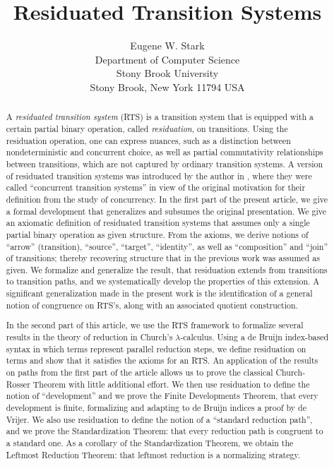 \documentclass[11pt,notitlepage,a4paper]{report}
\begin{document}
\title{Residuated Transition Systems}
\author{Eugene W. Stark\\[\medskipamount]
        Department of Computer Science\\
        Stony Brook University\\
        Stony Brook, New York 11794 USA}
\maketitle

\begin{abstract}
A \emph{residuated transition system} (RTS) is a transition system that is equipped with a
certain partial binary operation, called \emph{residuation}, on transitions.
Using the residuation operation, one can express nuances, such as a distinction
between nondeterministic and concurrent choice, as well as partial commutativity
relationships between transitions, which are not captured by ordinary transition systems.
A version of residuated transition systems was introduced by the author in \cite{cts},
where they were called ``concurrent transition systems'' in view of the original
motivation for their definition from the study of concurrency.
In the first part of the present article, we give a formal development that generalizes
and subsumes the original presentation.  We give an axiomatic definition of residuated transition
systems that assumes only a single partial binary operation as given structure.
From the axioms, we derive notions of ``arrow'' (transition), ``source'', ``target'', ``identity'',
as well as ``composition'' and ``join'' of transitions; thereby recovering structure that in the
previous work was assumed as given.  We formalize and generalize the result, that residuation
extends from transitions to transition paths, and we systematically develop the properties of
this extension.  A significant generalization made in the present work is the identification of a
general notion of congruence on RTS's, along with an associated quotient construction.

In the second part of this article, we use the RTS framework to formalize several results in
the theory of reduction in Church's $\lambda$-calculus.  Using a de Bruijn index-based syntax
in which terms represent parallel reduction steps, we define residuation on terms and show that
it satisfies the axioms for an RTS.  An application of the results on paths from the
first part of the article allows us to prove the classical Church-Rosser Theorem with little
additional effort.  We then use residuation to define the notion of ``development''
and we prove the Finite Developments Theorem, that every development is finite,
formalizing and adapting to de Bruijn indices a proof by de Vrijer.
We also use residuation to define the notion of a ``standard reduction path'', and we prove
the Standardization Theorem: that every reduction path is congruent to a standard one.
As a corollary of the Standardization Theorem, we obtain the Leftmost Reduction Theorem:
that leftmost reduction is a normalizing strategy.
\end{abstract}
\end{document}
